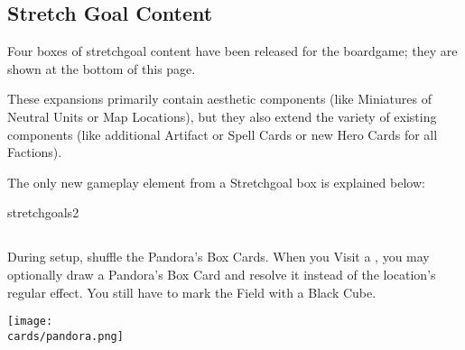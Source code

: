 \newpage
\begin{multicols}{2}

\subsection*{Stretch Goal Content}

Four boxes of stretchgoal content have been released for the boardgame; they are shown at the bottom of this page.\par
These expansions primarily contain aesthetic components (like Miniatures of Neutral Units or Map Locations), but they also extend the variety of existing components (like additional Artifact or Spell Cards or new Hero Cards for all Factions).\par
\smallskip

The only new gameplay element from a Stretchgoal box is explained below:\par
\vspace*{1em}
 \begin{expansion}{stretchgoals2}
   \subsection*{}
   During setup, shuffle the Pandora's Box Cards.
   When you Visit a , you may optionally draw a Pandora's Box Card and resolve it instead of the location's regular effect.
   You still have to mark the Field with a Black Cube.

   \medskip
   \begin{center}
     \texttt{[image: \\cards/pandora.png]}
   \end{center}
 \end{expansion}
 \vspace*{\fill}
 \columnbreak

\end{multicols}
